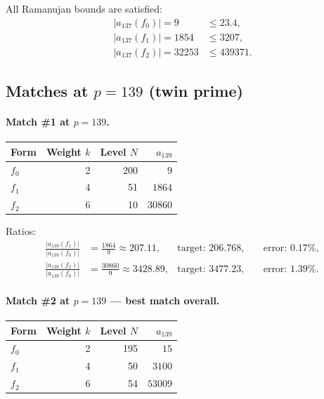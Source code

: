 \documentclass[12pt,a4paper]{article}
\begin{document}
All Ramanujan bounds are satisfied:
\begin{align*}
  |a_{137}(f_0)| = 9   &\le 23.4,\\
  |a_{137}(f_1)| = 1854 &\le 3207,\\
  |a_{137}(f_2)| = 32253 &\le 439371.
\end{align*}

\subsection{Matches at \texorpdfstring{$p=139$}{p=139} (twin prime)}

\paragraph{Match \#1 at $p=139$.}

\begin{center}
\begin{tabular}{lrrr}
\toprule
Form & Weight $k$ & Level $N$ & $a_{139}$ \\
\midrule
$f_0$ & 2 & 200 & $9$     \\
$f_1$ & 4 & 51  & $1864$  \\
$f_2$ & 6 & 10  & $30860$ \\
\bottomrule
\end{tabular}
\end{center}

\noindent Ratios:
\begin{align*}
  \frac{|a_{139}(f_1)|}{|a_{139}(f_0)|}
    &= \frac{1864}{9} \approx 207.11,
    & \text{target: } 206.768,
    & \quad \text{error: } 0.17\%, \\[4pt]
  \frac{|a_{139}(f_2)|}{|a_{139}(f_0)|}
    &= \frac{30860}{9} \approx 3428.89,
    & \text{target: } 3477.23,
    & \quad \text{error: } 1.39\%.
\end{align*}

\paragraph{Match \#2 at $p=139$ — best match overall.}

\begin{center}
\begin{tabular}{lrrr}
\toprule
Form & Weight $k$ & Level $N$ & $a_{139}$ \\
\midrule
$f_0$ & 2 & 195 & $15$    \\
$f_1$ & 4 & 50  & $3100$  \\
$f_2$ & 6 & 54  & $53009$ \\
\bottomrule
\end{tabular}
\end{center}
\end{document}
